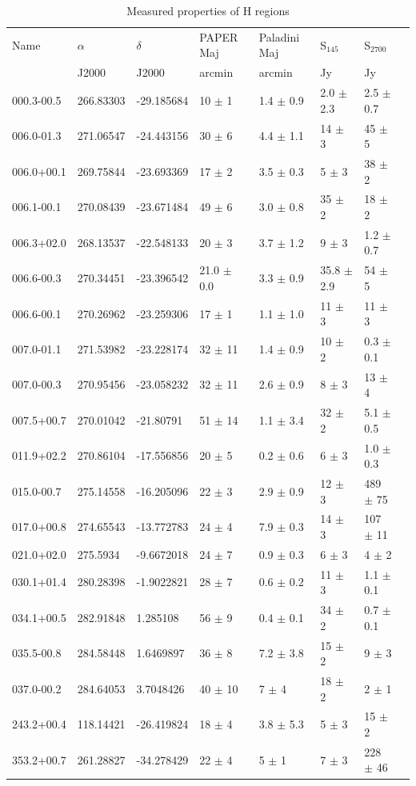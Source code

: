 \documentclass[useAMS,usenatbib]{mn2e}
\begin{document}
\begin{table}
\caption{Measured properties of {H} regions}
\begin{tabular}{llllllll}
\hline
Name &  $\alpha$   &  $\delta$  &  PAPER Maj   &  Paladini Maj &  S$_{145}$  &  S$_{2700}$\\
 & J2000  &  J2000  &  arcmin  &  arcmin  &  Jy  &  Jy\\
\hline
000.3-00.5 & 266.83303 & -29.185684 & 10 $\pm$ 1 & 1.4 $\pm$ 0.9 & {\color{red}2.0 $\pm$ 2.3} & 2.5 $\pm$ 0.7 \\
006.0-01.3 & 271.06547 & -24.443156 & 30 $\pm$ 6 & 4.4 $\pm$ 1.1 & 14 $\pm$ 3 & 45 $\pm$ 5 \\
006.0+00.1 & 269.75844 & -23.693369 & 17 $\pm$ 2 & 3.5 $\pm$ 0.3 & 5 $\pm$ 3 & 38 $\pm$ 2 \\
006.1-00.1 & 270.08439 & -23.671484 & 49 $\pm$ 6 & 3.0 $\pm$ 0.8 & 35 $\pm$ 2 & 18 $\pm$ 2 \\
006.3+02.0 & 268.13537 & -22.548133 & 20 $\pm$ 3 & 3.7 $\pm$ 1.2 & 9 $\pm$ 3 & 1.2 $\pm$ 0.7 \\
006.6-00.3 & 270.34451 & -23.396542 & {\color{red}21.0 $\pm$ 0.0} & 3.3 $\pm$ 0.9 & 35.8 $\pm$ 2.9 & 54 $\pm$ 5 \\
006.6-00.1 & 270.26962 & -23.259306 & 17 $\pm$ 1 & 1.1 $\pm$ 1.0 & 11 $\pm$ 3 & 11 $\pm$ 3 \\
007.0-01.1 & 271.53982 & -23.228174 & 32 $\pm$ 11 & 1.4 $\pm$ 0.9 & 10 $\pm$ 2 & 0.3 $\pm$ 0.1 \\
007.0-00.3 & 270.95456 & -23.058232 & 32 $\pm$ 11 & 2.6 $\pm$ 0.9 & 8 $\pm$ 3 & 13 $\pm$ 4 \\
007.5+00.7 & 270.01042 & -21.80791 & 51 $\pm$ 14 & {\color{red}1.1 $\pm$ 3.4} & 32 $\pm$ 2 & 5.1 $\pm$ 0.5 \\
011.9+02.2 & 270.86104 & -17.556856 & 20 $\pm$ 5 & {\color{red}0.2 $\pm$ 0.6} & 6 $\pm$ 3 & 1.0 $\pm$ 0.3 \\
015.0-00.7 & 275.14558 & -16.205096 & 22 $\pm$ 3 & 2.9 $\pm$ 0.9 & 12 $\pm$ 3 & 489 $\pm$ 75 \\
017.0+00.8 & 274.65543 & -13.772783 & 24 $\pm$ 4 & 7.9 $\pm$ 0.3 & 14 $\pm$ 3 & 107 $\pm$ 11 \\
021.0+02.0 & 275.5934 & -9.6672018 & 24 $\pm$ 7 & 0.9 $\pm$ 0.3 & 6 $\pm$ 3 & 4 $\pm$ 2 \\
030.1+01.4 & 280.28398 & -1.9022821 & 28 $\pm$ 7 & 0.6 $\pm$ 0.2 & 11 $\pm$ 3 & 1.1 $\pm$ 0.1 \\
034.1+00.5 & 282.91848 & 1.285108 & 56 $\pm$ 9 & 0.4 $\pm$ 0.1 & 34 $\pm$ 2 & 0.7 $\pm$ 0.1 \\
035.5-00.8 & 284.58448 & 1.6469897 & 36 $\pm$ 8 & 7.2 $\pm$ 3.8 & 15 $\pm$ 2 & 9 $\pm$ 3 \\
037.0-00.2 & 284.64053 & 3.7048426 & 40 $\pm$ 10 & 7 $\pm$ 4 & 18 $\pm$ 2 & 2 $\pm$ 1 \\
243.2+00.4 & 118.14421 & -26.419824 & 18 $\pm$ 4 & {\color{red}3.8 $\pm$ 5.3} & 5 $\pm$ 3 & 15 $\pm$ 2 \\
353.2+00.7 & 261.28827 & -34.278429 & 22 $\pm$ 4 & 5 $\pm$ 1 & 7 $\pm$ 3 & 228 $\pm$ 46 \\
\hline
\end{tabular}
\label{tab:hii}
\end{table}
\end{document}

